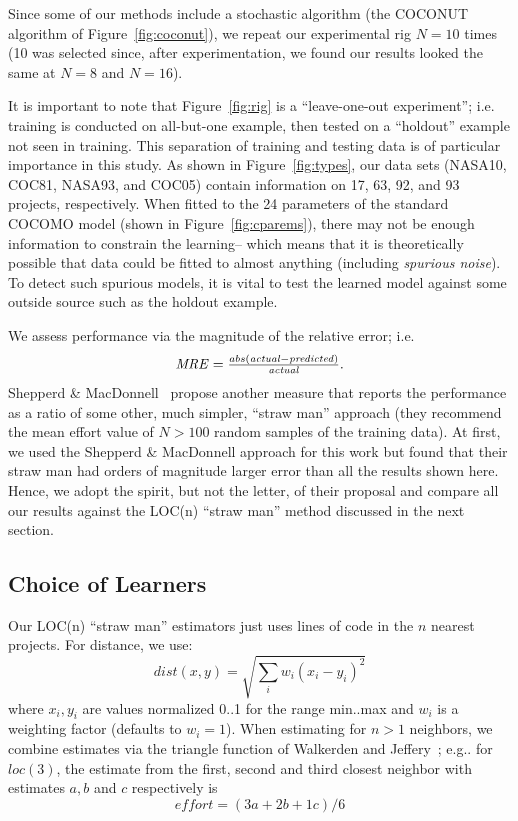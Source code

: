 \documentclass[smallcondesed]{svjour3}
\newcommand{\fig}[1]{Figure~\ref{fig:#1}}
\newenvironment{changed}{\par}{\par}
\begin{document}
Since some of our methods include a stochastic
algorithm (the COCONUT algorithm of \fig{coconut}),
we repeat our experimental rig   $N=10$ times
(10 was selected since, after experimentation, we
found our results looked the same at $N=8$ and
$N=16$).



\begin{changed}
It is important to note that Figure~\ref{fig:rig} is a ``leave-one-out experiment''; i.e.
training is conducted on all-but-one example, then tested
on a ``holdout'' example not seen in training. This separation of training and testing
data is of particular
importance in this study. 
As shown in \fig{types}, our  data sets (NASA10, COC81, NASA93, and COC05)
contain information on 17, 63, 92, and 93  projects, respectively. When fitted to
the   24 parameters of the standard COCOMO model  (shown in \fig{cparems}),
there may not be enough information to constrain the learning-- which means that it is theoretically
possible that data could be fitted to almost anything (including {\em spurious noise}).
To detect such spurious models, it is vital to test the learned model against some
outside source such as the holdout example.
\end{changed} 

We assess  
performance via the magnitude of the relative error; i.e.
\begin{equation}\label{eq:mre}
\mbox{$ \mathit{MRE}=\frac{abs(\mathit{actual} - \mathit{predicted})}{\mathit{actual}}$}.
\end{equation}
Shepperd \& MacDonnell~\cite{shepperd12a} propose
another measure that reports the performance as a
ratio of some other, much
simpler, ``straw man'' approach (they recommend the
mean effort value of $N>100$ random samples of the
training data). At first, we used the Shepperd \&
MacDonnell approach for this work but found that
their straw man had orders of magnitude larger error
than all the results shown here. Hence, we adopt the
spirit, but not the letter, of their proposal and
compare all our results against the LOC(n) ``straw
man'' method discussed in the next section.
 

\subsection{Choice of Learners}\label{sect:whatlearn}

Our LOC(n) ``straw man'' 
estimators just uses  lines of code
in the $n$ nearest projects. For distance,
we use:
\begin{equation}\label{eq:dist}
\mathit{dist}(x,y) = \sqrt{\sum_i w_i (x_i-y_i)^2}
\end{equation} 
where $x_i,y_i$ 
are values normalized 0..1 for the range min..max
and $w_i$ is a weighting factor (defaults to $w_i=1$).
When  estimating for $n>1$ neighbors,
we combine estimates via the triangle 
function of  Walkerden
and Jeffery~\cite{Walkerden1999}; 
e.g.. for $loc(3)$, the  estimate
from the first, second and third closest neighbor with estimates
$a,b$ and $c$ respectively is
\begin{equation}\label{eq:tri}
\mathit{effort} = (3a + 2b + 1c)/6
\end{equation}
\end{document}
